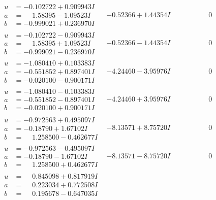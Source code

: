 \documentclass[1p]{elsarticle_modified}
\theoremstyle{definition}
\begin{document}
$$\begin{array}{c|c|c}
 \hline 
\begin{aligned}
u &= -0.102722 + 0.909943 I \\
a &= \phantom{-}1.58395 - 1.09523 I \\
b &= -0.999021 + 0.236970 I\end{aligned}
 & -0.52366 + 1.44354 I & \phantom{-0.000000 } 0 \\ \hline\begin{aligned}
u &= -0.102722 - 0.909943 I \\
a &= \phantom{-}1.58395 + 1.09523 I \\
b &= -0.999021 - 0.236970 I\end{aligned}
 & -0.52366 - 1.44354 I & \phantom{-0.000000 } 0 \\ \hline\begin{aligned}
u &= -1.080410 + 0.103383 I \\
a &= -0.551852 + 0.897401 I \\
b &= -0.020100 - 0.900171 I\end{aligned}
 & -4.24460 - 3.95976 I & \phantom{-0.000000 } 0 \\ \hline\begin{aligned}
u &= -1.080410 - 0.103383 I \\
a &= -0.551852 - 0.897401 I \\
b &= -0.020100 + 0.900171 I\end{aligned}
 & -4.24460 + 3.95976 I & \phantom{-0.000000 } 0 \\ \hline\begin{aligned}
u &= -0.972563 + 0.495097 I \\
a &= -0.18790 + 1.67102 I \\
b &= \phantom{-}1.258500 - 0.462677 I\end{aligned}
 & -8.13571 + 8.75720 I & \phantom{-0.000000 } 0 \\ \hline\begin{aligned}
u &= -0.972563 - 0.495097 I \\
a &= -0.18790 - 1.67102 I \\
b &= \phantom{-}1.258500 + 0.462677 I\end{aligned}
 & -8.13571 - 8.75720 I & \phantom{-0.000000 } 0 \\ \hline\begin{aligned}
u &= \phantom{-}0.845098 + 0.817919 I \\
a &= \phantom{-}0.223034 + 0.772508 I \\
b &= \phantom{-}0.195678 - 0.647035 I\end{aligned}

\end{array}$$
\end{document}
